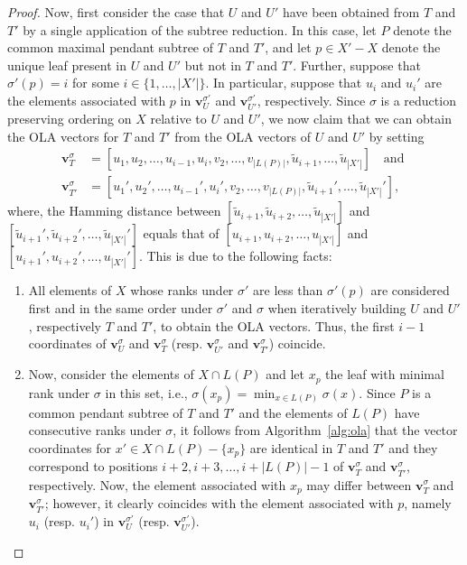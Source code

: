 \documentclass{article}
\begin{document}
\begin{proof}
    Now, first consider the case that $U$ and $U'$ have been obtained from $T$ and $T'$ by a single application of the subtree reduction. In this case, let $P$ denote the common maximal pendant subtree of $T$ and $T'$, and let $p \in X'-X$ denote the unique leaf present in $U$ and $U'$ but not in $T$ and $T'$. Further, suppose that $\sigma'(p)=i$ for some $i \in \{1, \ldots, |X'|\}$. In particular, suppose that $u_i$ and $u_i'$ are the elements associated with $p$ in $\mathbf{v}^{\sigma'}_U$ and $\mathbf{v}^{\sigma'}_{U'}$, respectively. Since $\sigma$ is a reduction preserving ordering on $X$ relative to $U$ and $U'$, we now claim that we can obtain the OLA vectors for $T$ and $T'$ from the OLA vectors of $U$ and $U'$ by setting
    \begin{align*}
        \mathbf{v}^{\sigma}_T &= [u_1, u_2, \ldots, u_{i-1}, u_i, v_2, \ldots, v_{|L(P)|}, \widetilde{u}_{i+1}, \ldots, \widetilde{u}_{|X'|}] \quad \text{and } \\
        \mathbf{v}^{\sigma}_{T'} &= [u_1', u_2', \ldots, u_{i-1}', u_i', v_2, \ldots, v_{|L(P)|}, \widetilde{u}_{i+1}', \ldots, \widetilde{u}_{|X'|}'],
    \end{align*}
    where, the Hamming distance between $[\widetilde{u}_{i+1},\widetilde{u}_{i+2}, \ldots, \widetilde{u}_{|X'|}]$ and $[\widetilde{u}_{i+1}',\widetilde{u}_{i+2}', \ldots, \widetilde{u}_{|X'|}']$ equals that of $[u_{i+1},u_{i+2}, \ldots, u_{|X'|}]$ and  $[u_{i+1}',u_{i+2}', \ldots, u_{|X'|}']$.
    This is due to the following facts:
        \begin{enumerate}[label={\upshape(\roman*)}]
            \item All elements of $X$ whose ranks under $\sigma'$ are less than $\sigma'(p)$ are considered first and in the same order under $\sigma'$ and $\sigma$ when iteratively building $U$ and $U'$, respectively $T$ and $T'$, to obtain the OLA vectors. Thus, the first $i-1$ coordinates of $\mathbf{v}^{\sigma}_U$ and $\mathbf{v}^{\sigma}_T$ (resp. $\mathbf{v}^{\sigma}_{U'}$ and $\mathbf{v}^{\sigma}_{T'}$) coincide. 
            
            \item Now, consider the elements of $X \cap L(P)$ and let $x_p$ the leaf with minimal rank under $\sigma$ in this set, i.e., $\sigma(x_p) = \min_{x \in L(P)} \sigma(x)$. 
            Since $P$ is a common pendant subtree of $T$ and $T'$ and the elements of $L(P)$ have consecutive ranks under $\sigma$, it follows from Algorithm~\ref{alg:ola} that the vector coordinates for $x' \in X \cap L(P)- \{x_p\}$ are identical in $T$ and $T'$ and they correspond to positions $i+2, i+3,\ldots, i+|L(P)|-1$ of $\mathbf{v}^{\sigma}_T$ and $\mathbf{v}^{\sigma}_{T'}$, respectively. Now, the element associated with $x_p$ may differ between $\mathbf{v}^{\sigma}_T$ and $\mathbf{v}^{\sigma}_{T'}$; however, it clearly coincides with the element associated with $p$, namely $u_i$ (resp. $u_i'$) in $\mathbf{v}^{\sigma'}_U$ (resp. $\mathbf{v}^{\sigma'}_{U'}$).
            

\end{enumerate}
\end{proof}
\end{document}
